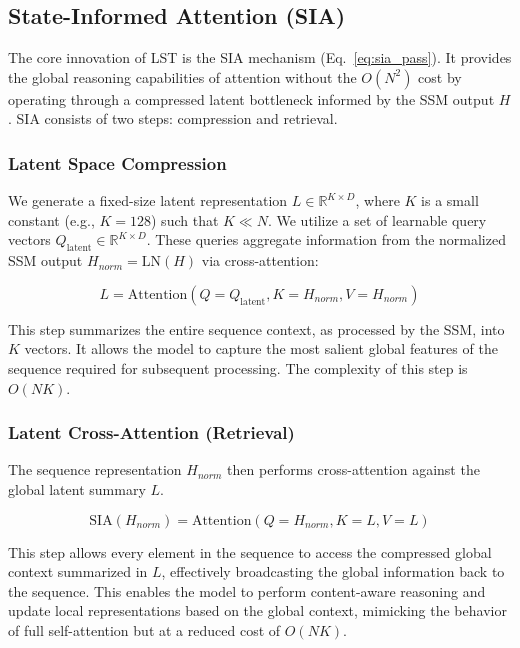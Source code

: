 \documentclass[10pt,twocolumn,letterpaper]{article}
\begin{document}
\subsection{State-Informed Attention (SIA)}

The core innovation of LST is the SIA mechanism (Eq.~\ref{eq:sia_pass}). It provides the global reasoning capabilities of attention without the \(O(N^{2})\) cost by operating through a compressed latent bottleneck informed by the SSM output \(H\). SIA consists of two steps: compression and retrieval.

\subsubsection{Latent Space Compression}

We generate a fixed-size latent representation \(L\in\mathbb{R}^{K\times D}\), where \(K\) is a small constant (e.g., \(K{=}128\)) such that \(K\ll N\). We utilize a set of learnable query vectors \(Q_{\text{latent}}\in\mathbb{R}^{K\times D}\). These queries aggregate information from the normalized SSM output \(H_{norm} = \text{LN}(H)\) via cross-attention:

\begin{equation}
L = \text{Attention}(Q=Q_{\text{latent}}, K=H_{norm}, V=H_{norm})
\end{equation}

This step summarizes the entire sequence context, as processed by the SSM, into \(K\) vectors. It allows the model to capture the most salient global features of the sequence required for subsequent processing. The complexity of this step is \(O(NK)\).

\subsubsection{Latent Cross-Attention (Retrieval)}

The sequence representation \(H_{norm}\) then performs cross-attention against the global latent summary \(L\).

\begin{equation}
\text{SIA}(H_{norm}) = \text{Attention}(Q=H_{norm}, K=L, V=L)
\end{equation}

This step allows every element in the sequence to access the compressed global context summarized in \(L\), effectively broadcasting the global information back to the sequence. This enables the model to perform content-aware reasoning and update local representations based on the global context, mimicking the behavior of full self-attention but at a reduced cost of \(O(NK)\).
\end{document}
